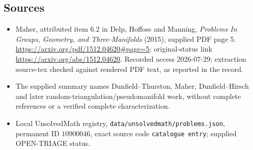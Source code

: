 \documentclass[11pt]{article}
\begin{document}
\subsection{Sources}
\begin{itemize}
\item Maher, attributed item 6.2 in Delp, Hoffoss and Manning, \emph{Problems In Groups, Geometry, and Three-Manifolds} (2015), supplied PDF page 5. \url{https://arxiv.org/pdf/1512.04620#page=5}; original-status link \url{https://arxiv.org/abs/1512.04620}. Recorded access 2026-07-29; extraction source-tex checked against rendered PDF text, as reported in the record.
\item The supplied summary names Dunfield--Thurston, Maher, Dunfield--Hirsch and later random-triangulation/pseudomanifold work, without complete references or a verified complete characterization.
\item Local UnsolvedMath registry, \texttt{data/unsolvedmath/problems.json}, permanent ID \(10900046\), exact source code \texttt{catalogue entry}; supplied OPEN-TRIAGE status.
\end{itemize}
\end{document}
